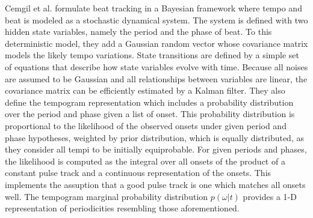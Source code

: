 \documentclass{scrartcl}
\begin{document}


Cemgil et al. \cite{Cemgil2001} formulate beat tracking in a Bayesian framework where tempo and beat is modeled as a stochastic dynamical system. The system is defined with two hidden state variables, namely the period and the phase of beat. To this deterministic model, they add a Gaussian random vector whose covariance matrix models the likely tempo variations. State transitions are defined by a simple set of equations that describe how state variables evolve with time. 
Because all noises are assumed to be Gaussian and all relationships between variables are linear, the covariance matrix can be efficiently estimated by a Kalman filter. They also define the tempogram representation which includes a probability distribution over the period and phase given a list of onset. This probability distribution is proportional to the likelihood of the observed onsets under given period and phase hypotheses, weighted by prior distribution, which is equally distributed, as they consider all tempi to be initially equiprobable. For given periods and phases, the likelihood is computed as the integral over all onsets of the product of a constant pulse track and a continuous representation of the onsets. This implements the assuption that a good pulse track is one which matches all onsets well. The tempogram marginal probability distribution $p(\omega | t)$ provides a 1-D representation of periodicities resembling those aforementioned. 
\end{document}

